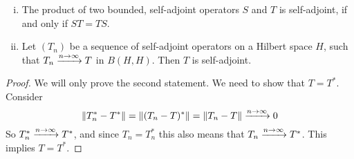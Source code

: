 \documentclass[../../script.tex]{subfiles}
\begin{document}
    \begin{thm}
        \begin{enumerate}[(i)]
            \item The product of two bounded, self-adjoint operators $S$ and $T$ is self-adjoint, if and only if $ST = TS$.
            \item Let $(T_n)$ be a sequence of self-adjoint operators on a Hilbert space $H$, such that $T_n \conv{n \rightarrow \infty} T$ in $B(H, H)$. Then $T$ is self-adjoint.
        \end{enumerate}
    \end{thm}
    \begin{proof}
        We will only prove the second statement. We need to show that $T = T^*$. Consider 
        \begin{equation}
            \norm{T_n^* - T^*} = \norm{(T_n - T)^*} = \norm{T_n - T} \conv{n \rightarrow \infty} 0
        \end{equation}
        So $T_n^* \conv{n \rightarrow \infty} T^*$, and since $T_n = T_n^*$ this also means that $T_n \conv{n \rightarrow \infty} T^*$. This implies $T = T^*$.
    \end{proof}
\end{document}
